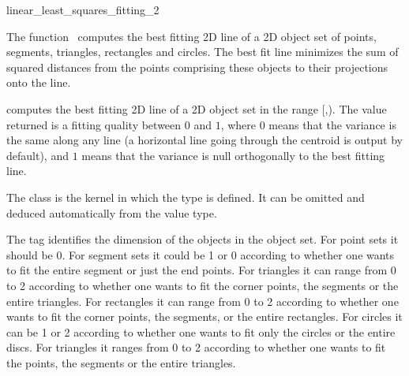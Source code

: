 
\begin{ccRefFunction}{linear_least_squares_fitting_2}  

\ccDefinition
  
The function \ccRefName\ computes the best fitting 2D line of a 2D object set of points, segments, triangles, rectangles and circles. The best fit line minimizes the sum of squared distances from the points comprising these objects to their projections onto the line.


{ computes the best fitting 2D line of a 2D object set in the range
[,). The value returned is a fitting quality
between $0$ and $1$, where $0$ means that the variance is the same
along any line (a horizontal line going through the centroid is output
by default), and $1$ means that the variance is null orthogonally
to the best fitting line.
 }

The class  is the kernel in which the type  is defined. It can be omitted and deduced automatically from the value type.

The tag  identifies the dimension of the objects in the object set. For point sets it should be 0. For segment sets it could be 1 or 0 according to whether one wants to fit the entire segment or just the end points. For triangles it can range from 0 to 2 according to whether one wants to fit the corner points, the segments or the entire triangles. For rectangles it can range from 0 to 2 according to whether one wants to fit the corner points, the segments, or the entire rectangles. For circles it can be 1 or 2 according to whether one wants to fit only the circles or the entire discs. For triangles it ranges from 0 to 2 according to whether one wants to fit the points, the segments or the entire triangles.



\end{ccRefFunction}
